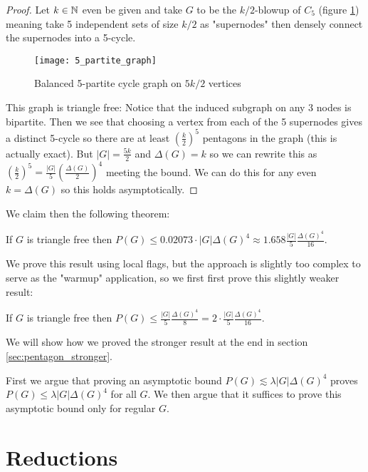 \begin{proof}
    Let $k\in\mathbb{N}$ even be given and take $G$ to be the $k/2$-blowup of $C_5$
    (figure \ref{fig:5_partite_graph}) meaning take 5 independent sets of size $k/2$ as
    "supernodes" then densely connect the supernodes into a 5-cycle.
    \begin{figure}[ht]
        \centering
        \texttt{[image: 5\_partite\_graph]}
        \caption{Balanced 5-partite cycle graph on $5k/2$ vertices}
        \label{fig:5_partite_graph}
    \end{figure}
    This graph is triangle free: Notice that the induced subgraph on any 3 nodes is bipartite.
    Then we see that choosing
    a vertex from each of the 5 supernodes gives a distinct 5-cycle so there are at
    least $\left(\frac{k}{2}\right)^5$ pentagons in the graph (this is actually exact). But
    $|G|=\frac{5k}{2}$ and $\Delta(G)=k$ so we can rewrite this as
    $\left(\frac{k}{2}\right)^5 = \frac{|G|}{5}\left(\frac{\Delta(G)}{2}\right)^4$ meeting
    the bound. We can do this for any even $k=\Delta(G)$ so this holds asymptotically.
\end{proof}

We claim then the following theorem:
\begin{theorem}
    \label{thm:full_pentagon_bound}
    If $G$ is triangle free then
    $P(G) \leq 0.02073 \cdot |G|\Delta(G)^4 \approx 1.658\frac{|G|}{5}\frac{\Delta(G)^4}{16}$.
\end{theorem}

We prove this result using local flags, but the approach is slightly too complex to serve
as the "warmup" application, so we first first prove this slightly weaker result:

\begin{theorem}
    \label{thm:simple_pentagon_bound}
    If $G$ is triangle free then
    $P(G) \leq \frac{|G|}{5}\frac{\Delta(G)^4}{8} = 2\cdot\frac{|G|}{5}\frac{\Delta(G)^4}{16}$.
\end{theorem}

We will show how we proved the stronger result at the end in section
\ref{sec:pentagon_stronger}.

First we argue that proving an asymptotic bound $P(G) \lesssim \lambda|G|\Delta(G)^4$
proves $P(G) \leq \lambda|G|\Delta(G)^4$ for all $G$.
We then argue that it suffices to prove this asymptotic bound only for regular $G$.

\section{Reductions}

